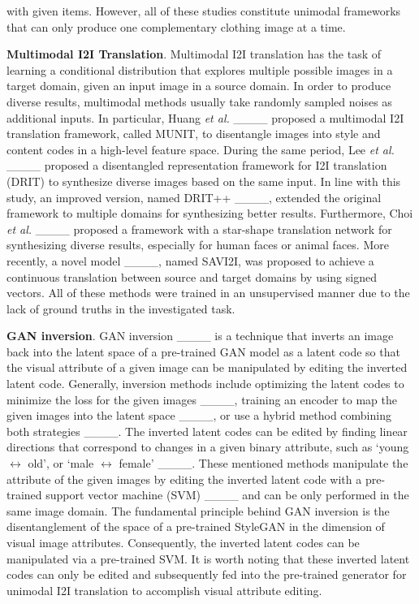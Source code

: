 with given items. However, all of these studies constitute unimodal frameworks that can only produce one complementary clothing image at a time.
	
	
	\textbf{Multimodal I2I Translation}. Multimodal I2I translation has the task of learning a conditional distribution that explores multiple possible images in a target domain, given an input image in a source domain. In order to produce diverse results, multimodal methods usually take randomly sampled noises as additional inputs. In particular, Huang \textit{et al.} ____ proposed a multimodal I2I translation framework, called MUNIT, to disentangle images into style and content codes in a high-level feature space. During the same period, Lee \textit{et al.} ____ proposed a disentangled representation framework for I2I translation (DRIT) to synthesize diverse images based on the same input. In line with this study, an improved version, named DRIT++ ____, extended the original framework to multiple domains for synthesizing better results. Furthermore, Choi \textit{et al.} ____ proposed a framework with a star-shape translation network for synthesizing diverse results, especially for human faces or animal faces. More recently, a novel model ____, named SAVI2I, was proposed to achieve a continuous translation between source and target domains by using signed vectors. All of these methods were trained in an unsupervised manner due to the lack of ground truths in the investigated task.
	
	\textbf{GAN inversion}. GAN inversion ____ is a technique that inverts an image back into the latent space of a pre-trained GAN model as a latent code so that the visual attribute of a given image can be manipulated by editing the inverted latent code. Generally, inversion methods include optimizing the latent codes to minimize the loss for the given images ____, training an encoder to map the given images into the latent space  ____, or use a  hybrid method combining both strategies ____. The inverted latent codes can be edited by finding linear directions that correspond to changes in a given binary attribute, such as `young $\leftrightarrow$ old', or `male $\leftrightarrow$ female' ____. These mentioned methods manipulate the attribute of the given images by editing the inverted latent code with a pre-trained support vector machine (SVM)  ____ and can be only performed in the same image domain. The fundamental principle behind GAN inversion is the disentanglement of the space of a pre-trained StyleGAN in the dimension of visual image attributes. Consequently, the inverted latent codes can be manipulated via a pre-trained SVM. It is worth noting that these inverted latent codes can only be edited and subsequently fed into the pre-trained generator for unimodal I2I translation to accomplish visual attribute editing.
	
